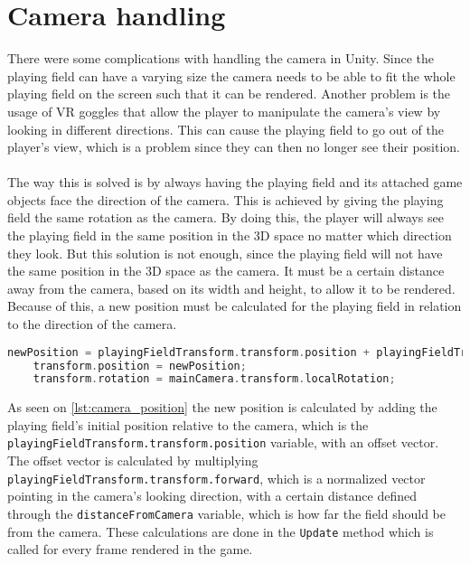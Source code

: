 \section{Camera handling}
There were some complications with handling the camera in Unity.
Since the playing field can have a varying size the camera needs to be able to fit the whole playing field on the screen such that it can be rendered.
Another problem is the usage of VR goggles that allow the player to manipulate the camera's view by looking in different directions.
This can cause the playing field to go out of the player's view, which is a problem since they can then no longer see their position.
\\\\
The way this is solved is by always having the playing field and its attached game objects face the direction of the camera.
This is achieved by giving the playing field the same rotation as the camera.
By doing this, the player will always see the playing field in the same position in the 3D space no matter which direction they look.
But this solution is not enough, since the playing field will not have the same position in the 3D space as the camera.
It must be a certain distance away from the camera, based on its width and height, to allow it to be rendered. 
Because of this, a new position must be calculated for the playing field in relation to the direction of the camera. 
\begin{lstlisting}[caption={Calculating and setting the position and rotation of the playing field}, captionpos=b,language=C,label={lst:camera_position}]
    newPosition = playingFieldTransform.transform.position + playingFieldTransform.transform.forward * distanceFromCamera;
    transform.position = newPosition;
    transform.rotation = mainCamera.transform.localRotation; 
\end{lstlisting}
As seen on \autoref{lst:camera_position} the new position is calculated by adding the playing field's initial position relative to the camera, which is the \texttt{playingFieldTransform.transform.position} variable, with an offset vector.
The offset vector is calculated by multiplying \texttt{playingFieldTransform.transform.forward}, which is a normalized vector pointing in the camera's looking direction, with a certain distance defined through the \texttt{distanceFromCamera} variable, which is how far the field should be from the camera.
These calculations are done in the \texttt{Update} method which is called for every frame rendered in the game.
\\\\

